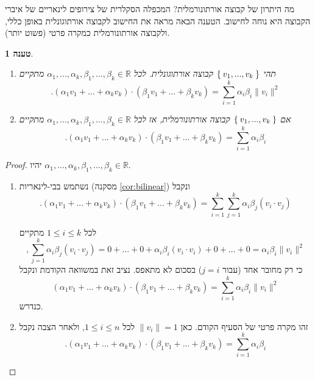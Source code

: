 \documentclass[12pt]{report}
\theoremstyle{plain}
\newtheorem{proposition}[theorem]{טענה}
\theoremstyle{definition}
\newcommand{\R}{\mathbb{R}}
\newcommand{\0}{\mathbf{0}}
\begin{document}
מה היתרון של קבוצה אורתונורמלית? המכפלה הסקלרית של צירופים לינאריים של איברי הקבוצה היא נוחה לחישוב. הטענה הבאה מראה את החישוב לקבוצה אורתוגונלית באופן כללי, ולקבוצה אורתונורמלית כמקרה פרטי (פשוט יותר).

\begin{proposition}\label{prop:ortho-dot}\
\begin{enumerate}[label=\alph*.]
\item
תהי
$\Set{v_1,...,v_k}$
קבוצה אורתוגונלית. לכל
$\alpha_1,...,\alpha_k,\beta_1,...,\beta_k\in\R$
מתקיים
$$
.(\alpha_1v_1+...+\alpha_kv_k)\cdot(\beta_1v_1+...+\beta_kv_k)=\sum_{i=1}^k\alpha_i\beta_i\|v_i\|^2
$$


\item
אם
$\Set{v_1,...,v_k}$
קבוצה אורתונורמלית, אז לכל
$\alpha_1,...,\alpha_k,\beta_1,...,\beta_k\in\R$
מתקיים
$$
.(\alpha_1v_1+...+\alpha_kv_k)\cdot(\beta_1v_1+...+\beta_kv_k)=\sum_{i=1}^k\alpha_i\beta_i
$$


\end{enumerate}
\end{proposition}

\begin{proof}
יהיו
$\alpha_1,...,\alpha_k,\beta_1,...,\beta_k\in\R$.

\begin{enumerate}[label=\alph*.]
\item 
נשתמש בבי-לינאריות (מסקנה
\ref{cor:bilinear})
ונקבל
$$
.(\alpha_1v_1+...+\alpha_kv_k)\cdot(\beta_1v_1+...+\beta_kv_k)=\sum_{i=1}^k\sum_{j=1}^k\alpha_i\beta_j(v_i\cdot v_j)
$$

לכל
$1\leq i\leq k$
מתקיים
$$
,\sum_{j=1}^k\alpha_i\beta_j(v_i\cdot v_j)=0+...+0+\alpha_i\beta_i(v_i\cdot v_i)+0+...+0=\alpha_i\beta_i\|v_i\|^2
$$
כי רק מחובר אחד (עבור
$j=i$)
בסכום לא מתאפס. נציב זאת במשוואה הקודמת ונקבל
$$
(\alpha_1v_1+...+\alpha_kv_k)\cdot(\beta_1v_1+...+\beta_kv_k)=\sum_{i=1}^k\alpha_i\beta_i\|v_i\|^2
$$
כנדרש.


\item 
זהו מקרה פרטי של הסעיף הקודם. כאן
$\|v_i\|=1$
לכל
$1\leq i\leq n$,
ולאחר הצבה נקבל
$$
.(\alpha_1v_1+...+\alpha_kv_k)\cdot(\beta_1v_1+...+\beta_kv_k)=\sum_{i=1}^k\alpha_i\beta_i
$$

\end{enumerate}
\end{proof}
\end{document}
